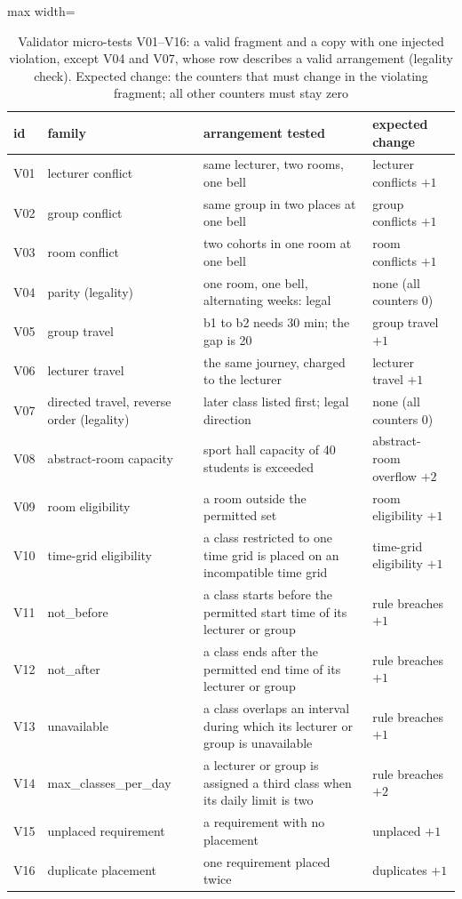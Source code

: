 \begin{table}[t]
\centering
\caption{Validator micro-tests V01--V16: a valid fragment and a copy with one injected
violation, except V04 and V07, whose row describes a valid arrangement (legality check).
Expected change: the counters that must change in the violating fragment; all other
counters must stay zero}
\label{tab:validator}
\footnotesize
\begin{adjustbox}{max width=\textwidth}
\begin{tabular}{@{}l l p{78mm} l@{}}
\toprule
id & family & arrangement tested & expected change \\
\midrule
V01 & lecturer conflict & same lecturer, two rooms, one bell & lecturer conflicts $+1$ \\
V02 & group conflict & same group in two places at one bell & group conflicts $+1$ \\
V03 & room conflict & two cohorts in one room at one bell & room conflicts $+1$ \\
V04 & parity (legality) & one room, one bell, alternating weeks: legal & none (all counters 0) \\
V05 & group travel & b1 to b2 needs 30 min; the gap is 20 & group travel $+1$ \\
V06 & lecturer travel & the same journey, charged to the lecturer & lecturer travel $+1$ \\
V07 & directed travel, reverse order (legality) & later class listed first; legal direction & none (all counters 0) \\
V08 & abstract-room capacity & sport hall capacity of 40 students is exceeded & abstract-room overflow $+2$ \\
V09 & room eligibility & a room outside the permitted set & room eligibility $+1$ \\
V10 & time-grid eligibility & a class restricted to one time grid is placed on an incompatible time grid & time-grid eligibility $+1$ \\
V11 & not\_before & a class starts before the permitted start time of its lecturer or group & rule breaches $+1$ \\
V12 & not\_after & a class ends after the permitted end time of its lecturer or group & rule breaches $+1$ \\
V13 & unavailable & a class overlaps an interval during which its lecturer or group is unavailable & rule breaches $+1$ \\
V14 & max\_classes\_per\_day & a lecturer or group is assigned a third class when its daily limit is two & rule breaches $+2$ \\
V15 & unplaced requirement & a requirement with no placement & unplaced $+1$ \\
V16 & duplicate placement & one requirement placed twice & duplicates $+1$ \\
\bottomrule
\end{tabular}
\end{adjustbox}
\end{table}
